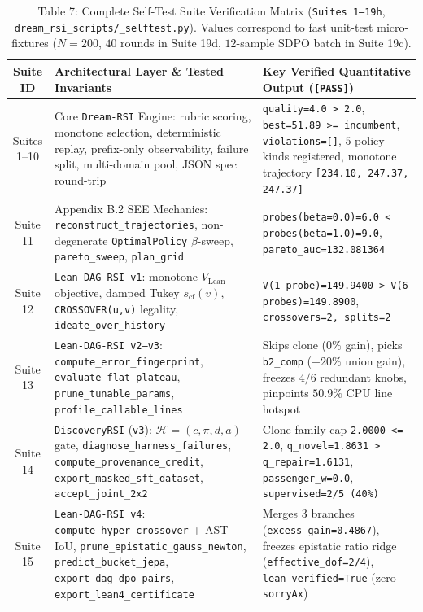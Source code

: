 \documentclass[11pt,a4paper]{article}
\begin{document}
\begin{table}[ht!]
\centering
\caption{Table 7: Complete Self-Test Suite Verification Matrix (\texttt{Suites 1--19h}, \texttt{dream\_rsi\_scripts/\_selftest.py}). Values correspond to fast unit-test micro-fixtures ($N=200$, $40$ rounds in Suite 19d, $12$-sample SDPO batch in Suite 19c).}
\label{tab:selftest}
\footnotesize
\begin{tabular}{cp{6.4cm}p{7.4cm}}
\toprule
\textbf{Suite ID} & \textbf{Architectural Layer \& Tested Invariants} & \textbf{Key Verified Quantitative Output (\texttt{[PASS]})} \\
\midrule
Suites 1--10 & Core \texttt{Dream-RSI} Engine: rubric scoring, monotone selection, deterministic replay, prefix-only observability, failure split, multi-domain pool, JSON spec round-trip & \texttt{quality=4.0 > 2.0}, \texttt{best=51.89 >= incumbent}, \texttt{violations=[]}, $5$ policy kinds registered, monotone trajectory \texttt{[234.10, 247.37, 247.37]} \\
\addlinespace
Suite 11 & Appendix B.2 SEE Mechanics: \texttt{reconstruct\_trajectories}, non-degenerate \texttt{OptimalPolicy} $\beta$-sweep, \texttt{pareto\_sweep}, \texttt{plan\_grid} & \texttt{probes(beta=0.0)=6.0 < probes(beta=1.0)=9.0}, \texttt{pareto\_auc=132.081364} \\
\addlinespace
Suite 12 & \texttt{Lean-DAG-RSI v1}: monotone $V_{\text{Lean}}$ objective, damped Tukey $s_{\text{cf}}(v)$, \texttt{CROSSOVER(u,v)} legality, \texttt{ideate\_over\_history} & \texttt{V(1 probe)=149.9400 > V(6 probes)=149.8900}, \texttt{crossovers=2, splits=2} \\
\addlinespace
Suite 13 & \texttt{Lean-DAG-RSI v2--v3}: \texttt{compute\_error\_fingerprint}, \texttt{evaluate\_flat\_plateau}, \texttt{prune\_tunable\_params}, \texttt{profile\_callable\_lines} & Skips clone ($0\%$ gain), picks \texttt{b2\_comp} ($+20\%$ union gain), freezes $4/6$ redundant knobs, pinpoints $50.9\%$ CPU line hotspot \\
\addlinespace
Suite 14 & \texttt{DiscoveryRSI} (\texttt{v3}): $\mathcal{H}=(c,\pi,d,a)$ gate, \texttt{diagnose\_harness\_failures}, \texttt{compute\_provenance\_credit}, \texttt{export\_masked\_sft\_dataset}, \texttt{accept\_joint\_2x2} & Clone family cap \texttt{2.0000 <= 2.0}, \texttt{q\_novel=1.8631 > q\_repair=1.6131}, \texttt{passenger\_w=0.0}, \texttt{supervised=2/5 (40\%)} \\
\addlinespace
Suite 15 & \texttt{Lean-DAG-RSI v4}: \texttt{compute\_hyper\_crossover} + AST IoU, \texttt{prune\_epistatic\_gauss\_newton}, \texttt{predict\_bucket\_jepa}, \texttt{export\_dag\_dpo\_pairs}, \texttt{export\_lean4\_certificate} & Merges 3 branches (\texttt{excess\_gain=0.4867}), freezes epistatic ratio ridge (\texttt{effective\_dof=2/4}), \texttt{lean\_verified=True} (zero \texttt{sorryAx}) \\

\end{tabular}
\end{table}
\end{document}
